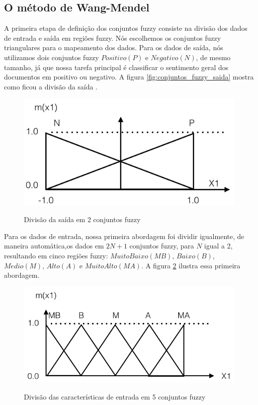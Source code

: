\subsection{O método de Wang-Mendel}

A primeira etapa de definição dos conjuntos fuzzy consiste na divisão dos dados de entrada e saída em regiões fuzzy. Nós escolhemos os conjuntos fuzzy triangulares para o mapeamento dos dados. Para os dados de saída, nós utilizamos dois conjuntos fuzzy $Positivo (P)$ e $Negativo (N)$, de mesmo tamanho, já que nossa tarefa principal é classificar o sentimento geral dos documentos em positivo ou negativo. A figura \ref{fig:conjuntos_fuzzy_saida} mostra como ficou a divisão da saída \cite{wang1992generating}. 

\begin{figure}[h]
\caption{Divisão da saída em 2 conjuntos fuzzy}
\centering
\includegraphics[scale=0.45]{conjuntos_fuzzy_saida.png}
\label{figura:conjuntos_fuzzy_saida}
\end{figure}

Para os dados de entrada, nossa primeira abordagem foi dividir igualmente, de maneira automática,os dados em $2N + 1$ \cite{wang1992generating} conjuntos fuzzy, para $N$ igual a 2, resultando em cinco regiões fuzzy: $Muito Baixo (MB)$, $Baixo (B)$, $Medio (M)$, $Alto (A)$ e $Muito Alto (MA)$. A figura \ref{figura:cinco_conjuntos_fuzzy} ilustra essa primeira abordagem.

\begin{figure}[h]
\caption{Divisão das características de entrada em 5 conjuntos fuzzy}
\centering
\includegraphics[scale=0.45]{cinco_conjuntos_fuzzy.png}
\label{figura:cinco_conjuntos_fuzzy}
\end{figure}

